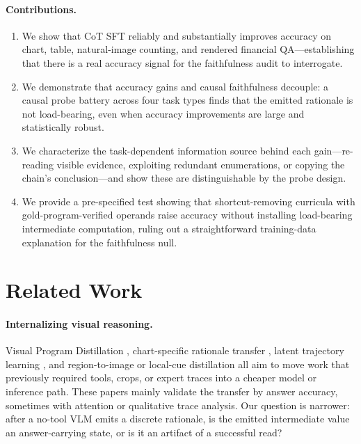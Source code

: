 \documentclass[11pt]{article}
\begin{document}
\paragraph{Contributions.}
\begin{enumerate}[leftmargin=1.6em,itemsep=2pt]
  \item We show that CoT SFT reliably and substantially improves accuracy on chart, table, natural-image counting, and rendered financial QA---establishing that there is a real accuracy signal for the faithfulness audit to interrogate.
  \item We demonstrate that accuracy gains and causal faithfulness decouple: a causal probe battery across four task types finds that the emitted rationale is not load-bearing, even when accuracy improvements are large and statistically robust.
  \item We characterize the task-dependent information source behind each gain---re-reading visible evidence, exploiting redundant enumerations, or copying the chain's conclusion---and show these are distinguishable by the probe design.
  \item We provide a pre-specified test showing that shortcut-removing curricula with gold-program-verified operands raise accuracy without installing load-bearing intermediate computation, ruling out a straightforward training-data explanation for the faithfulness null.
\end{enumerate}

\section{Related Work}
\label{sec:related}

\paragraph{Internalizing visual reasoning.}
Visual Program Distillation \citep{vpd}, chart-specific rationale transfer \citep{chartpali,chartr1}, latent trajectory learning \citep{pearl,capimagine2026}, and region-to-image or local-cue distillation \citep{zoomingwithoutzooming,locus} all aim to move work that previously required tools, crops, or expert traces into a cheaper model or inference path. These papers mainly validate the transfer by answer accuracy, sometimes with attention or qualitative trace analysis. Our question is narrower: after a no-tool VLM emits a discrete rationale, is the emitted intermediate value an answer-carrying state, or is it an artifact of a successful read?
\end{document}
